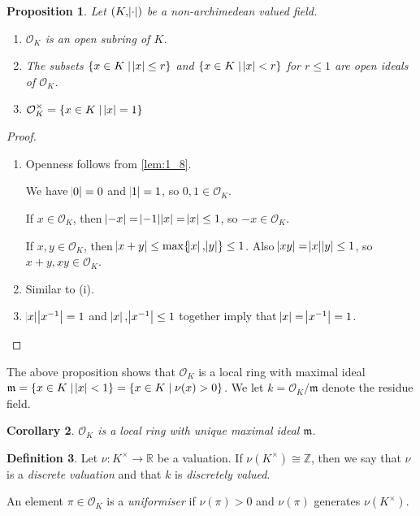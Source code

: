 \documentclass[12pt]{amsart}
\theoremstyle{definition}
\newtheorem{definition}{Definition}[section]
\theoremstyle{plain}
\newtheorem{proposition}[definition]{Proposition}
\newtheorem{corollary}[definition]{Corollary}
\theoremstyle{remark}
\newcommand{\bZ}{\mathbb{Z}}
\newcommand{\bR}{\mathbb{R}}
\newcommand{\cO}{\mathcal{O}}
\newcommand{\fm}{\mathfrak{m}}
\begin{document}
\begin{proposition}\label{prop:2_3}
    Let $(K, \abs{\cdot})$ be a non-archimedean valued field.
    \begin{enumerate}
        \item $\cO_K$ is an open subring of $K$.
        \item The subsets $\{x \in K \mid \abs{x} \le r\}$ and $\{x \in K \mid \abs{x} < r\}$ for $r \le 1$ are open ideals of $\cO_K$.
        \item $\cO_K^\times = \{x \in K \mid \abs{x} = 1\}$
    \end{enumerate}
\end{proposition}
\begin{proof}\phantom{}
    \begin{enumerate}
        \item Openness follows from \autoref{lem:1_8}.

            \noindent We have $\abs{0} = 0$ and $\abs{1} = 1$, so $0, 1 \in \cO_K$.

            \noindent If $x \in \cO_K$, then $\abs{-x} = \abs{-1}\abs{x} = \abs{x} \le 1$, so $-x \in \cO_K$.

            \noindent If $x, y \in \cO_K$, then $\abs{x + y} \le \max \{\abs{x}, \abs{y}\} \le 1$. Also $\abs{x y} = \abs{x} \abs{y} \le 1$, so $x + y, x y \in \cO_K$.

        \item Similar to (i).

        \item $\abs{x} \abs{x^{-1}} = 1$ and $\abs{x}, \abs{x^{-1}} \le 1$ together imply that $\abs{x} = \abs{x^{-1}} = 1$. \qedhere
    \end{enumerate}
\end{proof}

\noindent The above proposition shows that $\cO_K$ is a local ring with maximal ideal $\fm = \{x \in K \mid \abs{x} < 1\} = \{x \in K \mid \nu(x) > 0\}$. We let $k = \cO_K / \fm$ denote the residue field.

\begin{corollary}\label{cor:2_4}
    $\cO_K$ is a local ring with unique maximal ideal $\fm$.
\end{corollary}

\begin{definition}
    Let $\nu : K^\times \to \bR$ be a valuation. If $\nu(K^\times) \cong \bZ$, then we say that $\nu$ is a \emph{discrete valuation} and that $k$ is \emph{discretely valued}.

    An element $\pi \in \cO_K$ is a \emph{uniformiser} if $\nu(\pi) > 0$ and $\nu(\pi)$ generates $\nu(K^\times)$.
\end{definition}
\end{document}
